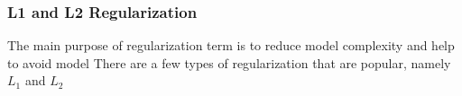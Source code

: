 \subsubsection{L1 and L2 Regularization}

The main purpose of regularization term is to reduce model complexity and help to avoid model There are a few types of regularization that are popular, namely $L_1$ and $L_2$